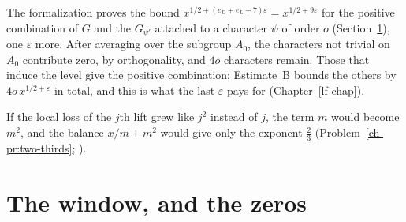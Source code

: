 \documentclass[reqno]{amsart}
\newcounter{chap}
\theoremstyle{definition}
\theoremstyle{plain}
\begin{document}
The formalization proves the bound \(x^{1/2+(e_D+e_L+7)\varepsilon} = x^{1/2+9\varepsilon}\) for the positive combination of \(G\) and the \(G_{\psi'}\) attached to a character \(\psi\) of order \(o\) (Section~\ref{sec:window}), one \(\varepsilon\) more.  After averaging over the subgroup \(A_0\), the characters not trivial on \(A_0\) contribute zero, by orthogonality, and \(4o\) characters remain.  Those that induce the level give the positive combination; Estimate~B bounds the others by \(4o\,x^{1/2+\varepsilon}\) in total, and this is what the last \(\varepsilon\) pays for (Chapter~\ref{lf-chap}).

If the local loss of the \(j\)th lift grew like \(j^2\) instead of \(j\), the term \(m\) would become \(m^2\), and the balance \(x/m + m^2\) would give only the exponent \(\frac23\) (Problem~\ref{ch-pr:two-thirds}; \cite[step~14]{Alp}).

\section{The window, and the zeros}\label{sec:window}
\end{document}
